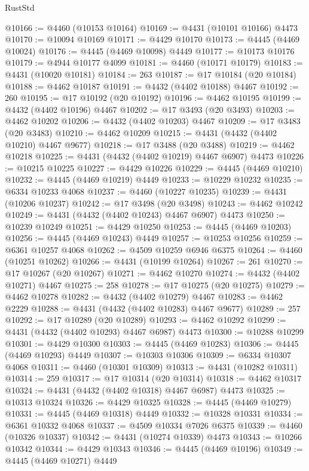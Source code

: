 \begin{lexlean}{RustStd}
\begin{coremodule}
@10166 := @4460 (@10153 @10164)
@10169 := @4431 (@10101 @10166) @4473
@10170 := @10094 @10169
@10171 := @4429 @10170
@10173 := @4445 (@4469 @10024)
@10176 := @4445 (@4469 @10098) @4449
@10177 := @10173 @10176
@10179 := @4944 @10177 @4099
@10181 := @4460 (@10171 @10179)
@10183 := @4431 (@10020 @10181)
@10184 := 263
@10187 := @17 @10184 (@20 @10184)
@10188 := @4462 @10187
@10191 := @4432 (@4402 @10188) @4467
@10192 := 260
@10195 := @17 @10192 (@20 @10192)
@10196 := @4462 @10195
@10199 := @4432 (@4402 @10196) @4467
@10202 := @17 @3493 (@20 @3493)
@10203 := @4462 @10202
@10206 := @4432 (@4402 @10203) @4467
@10209 := @17 @3483 (@20 @3483)
@10210 := @4462 @10209
@10215 := @4431 (@4432 (@4402 @10210) @4467 @9677)
@10218 := @17 @3488 (@20 @3488)
@10219 := @4462 @10218
@10225 := @4431 (@4432 (@4402 @10219) @4467 @6907) @4473
@10226 := @10215 @10225
@10227 := @4429 @10226
@10229 := @4445 (@4469 @10210)
@10232 := @4445 (@4469 @10219) @4449
@10233 := @10229 @10232
@10235 := @6334 @10233 @4068
@10237 := @4460 (@10227 @10235)
@10239 := @4431 (@10206 @10237)
@10242 := @17 @3498 (@20 @3498)
@10243 := @4462 @10242
@10249 := @4431 (@4432 (@4402 @10243) @4467 @6907) @4473
@10250 := @10239 @10249
@10251 := @4429 @10250
@10253 := @4445 (@4469 @10203)
@10256 := @4445 (@4469 @10243) @4449
@10257 := @10253 @10256
@10259 := @6361 @10257 @4068
@10262 := @4509 @10259 @6946 @6375
@10264 := @4460 (@10251 @10262)
@10266 := @4431 (@10199 @10264)
@10267 := 261
@10270 := @17 @10267 (@20 @10267)
@10271 := @4462 @10270
@10274 := @4432 (@4402 @10271) @4467
@10275 := 258
@10278 := @17 @10275 (@20 @10275)
@10279 := @4462 @10278
@10282 := @4432 (@4402 @10279) @4467
@10283 := @4462 @2229
@10288 := @4431 (@4432 (@4402 @10283) @4467 @9677)
@10289 := 257
@10292 := @17 @10289 (@20 @10289)
@10293 := @4462 @10292
@10299 := @4431 (@4432 (@4402 @10293) @4467 @6987) @4473
@10300 := @10288 @10299
@10301 := @4429 @10300
@10303 := @4445 (@4469 @10283)
@10306 := @4445 (@4469 @10293) @4449
@10307 := @10303 @10306
@10309 := @6334 @10307 @4068
@10311 := @4460 (@10301 @10309)
@10313 := @4431 (@10282 @10311)
@10314 := 259
@10317 := @17 @10314 (@20 @10314)
@10318 := @4462 @10317
@10324 := @4431 (@4432 (@4402 @10318) @4467 @6987) @4473
@10325 := @10313 @10324
@10326 := @4429 @10325
@10328 := @4445 (@4469 @10279)
@10331 := @4445 (@4469 @10318) @4449
@10332 := @10328 @10331
@10334 := @6361 @10332 @4068
@10337 := @4509 @10334 @7026 @6375
@10339 := @4460 (@10326 @10337)
@10342 := @4431 (@10274 @10339) @4473
@10343 := @10266 @10342
@10344 := @4429 @10343
@10346 := @4445 (@4469 @10196)
@10349 := @4445 (@4469 @10271) @4449

\end{coremodule}
\end{lexlean}

